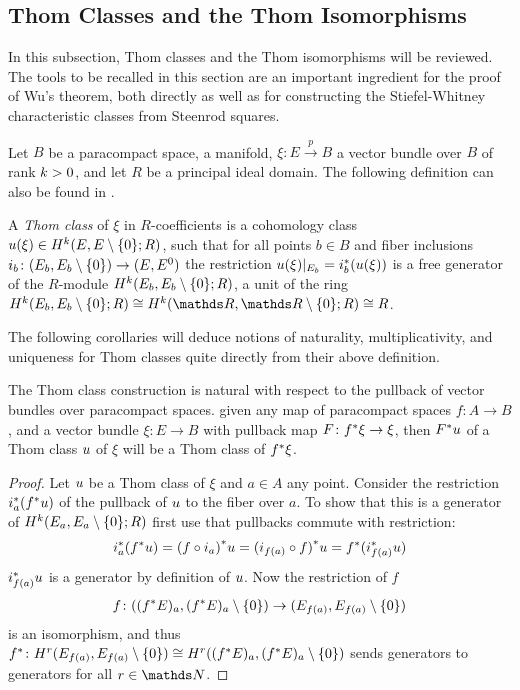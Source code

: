 \subsection{Thom Classes and the Thom Isomorphisms}\label{sec:thomclasses}
In this subsection, Thom classes and the Thom isomorphisms will be
reviewed. The tools to be recalled in this section are an important
ingredient for the proof of Wu's theorem, both directly as well as for
constructing the Stiefel-Whitney characteristic classes from Steenrod
squares.

Let $B$ be a paracompact space, \forexample a manifold,
$\xi\colon E\xrightarrow{p} B$ a vector bundle over $B$ of rank $k>0$,
and let $R$ be a principal ideal domain.
The following definition can \forexample also be found in
\cite[p.~441]{hatcher}.
\begin{Def}
  A \emph{Thom class} of $\xi$ in $R$-coefficients is a
  cohomology class ${u}(\xi)\in H^{k}(E, {E}\setminus\{0\}; R)$,
  such that for all points $b\in B$ and fiber inclusions
  $i_b\colon (E_b, {E_b}\setminus\{0\}) \to (E, {E}^0)$
  the restriction ${u}(\xi)|_{E_b} = {i}^*_b ({u}(\xi))$ is a
  free generator of the $R$-module $H^{k}(E_b, {E_b}\setminus\{0\}; R)$,
  \idest a unit
  of the ring
  $\H^{\rkk}(\spherepair{E_b};R)\cong \H^{\rkk}(\spherepair{\R}; R)\cong R$.
\end{Def}

The following corollaries will deduce notions of naturality,
multiplicativity, and uniqueness for Thom classes quite directly from
their above definition.

\begin{Cor}\label{cor:thomclsnatural}
  The Thom class construction is natural with respect to the pullback
  of vector bundles over paracompact spaces.
  \Idest given any map of paracompact spaces $f\colon A\to B$, and a
  vector bundle $\xi\colon E\to B$ with pullback map
  $F\colon{f}^*\xi\to\xi$,
  then ${F}^* u$ of a Thom class $u$ of $\xi$ will
  be a Thom class of ${f}^* \xi$.
  \begin{proof}
    Let $u$ be a Thom class of $\xi$ and $a\in A$ any point.
    Consider the restriction ${i}^*_a({f}^* u)$
    of the pullback of $u$ to the fiber over $a$. To show that this
    is a generator of $H^{k}(E_a, {E_a}\setminus\{0\};R)$ first use that
    pullbacks commute with restriction:
    \begin{gather*}
      {i}^*_a({f}^* u)
      = {(f\circ i_a)}^* u
      = {(i_{f(a)}\circ f)}^* u
      = {f}^* ({i}^*_{f(a)} u)
    \end{gather*}
    ${i}^*_{f(a)} u$ is a generator by definition of $u$.
    Now the restriction of $f$
    \begin{gather*}
      f\colon (({f}^* E)_a, {({f}^* E)_a}\setminus\{0\}) \to (E_{f(a)}, {E_{f(a)}}\setminus\{0\})
    \end{gather*}
    is an isomorphism, and thus
    ${f}^*\colon H^r(E_{f(a)}, {E_{f(a)}}\setminus\{0\})
    \cong H^r(({f}^* E)_a, {({f}^* E)_a}\setminus\{0\})$
    sends generators to generators for all $r\in\Nat$.
  \end{proof}
\end{Cor}

